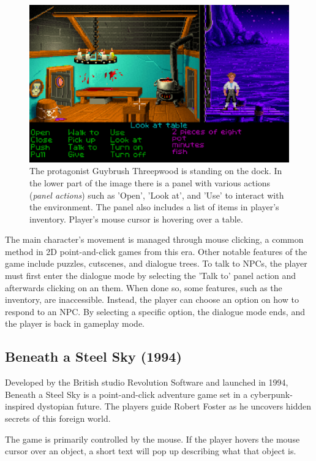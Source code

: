 \begin{figure}[H]
\centering
\includegraphics[width=1.\linewidth]{img/TSoMI.png}
\caption{The protagonist Guybrush Threepwood is standing on the dock. In the lower part of the image there is a panel with various actions (\textit{panel actions}) such as 'Open', 'Look at', and 'Use' to interact with the environment. The  panel also includes a list of items in player's inventory. Player's mouse cursor is hovering over a table.}
\label{fig:TSoMI}
\end{figure}

The main character's movement is managed through mouse clicking, a common method in 2D point-and-click games from this era. Other notable features of the game include puzzles, cutscenes, and dialogue trees. To talk to NPCs, the player must first enter the dialogue mode by selecting the 'Talk to' panel action and afterwards clicking on an them. When done so, some features, such as the inventory, are inaccessible. Instead, the player can choose an option on how to respond to an NPC. By selecting a specific option, the dialogue mode ends, and the player is back in gameplay mode.

\subsection{Beneath a Steel Sky (1994)}
Developed by the British studio Revolution Software and launched in 1994, Beneath a Steel Sky is a point-and-click adventure game set in a cyberpunk-inspired dystopian future. The players guide Robert Foster as he uncovers hidden secrets of this foreign world.

The game is primarily controlled by the mouse. If the player hovers the mouse cursor over an object, a short text will pop up describing what that object is.

